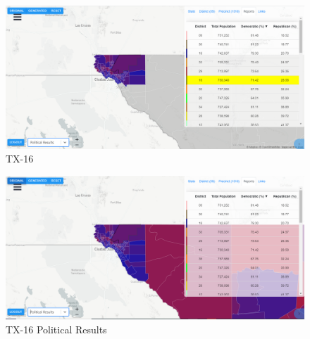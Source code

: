 \documentclass[letterpaper]{article}
\begin{document}
\begin{figure}[H]
	\includegraphics[width=\linewidth]{./figures/TX-16.png}
	\caption{TX-16}
	\label{fig:tx16border}
\end{figure}

\begin{figure}[H]
	\includegraphics[width=\linewidth]{./figures/TX-16-SurroundingArea.png}
	\caption{TX-16 Political Results}
	\label{fig:tx16political}
\end{figure}
\end{document}
